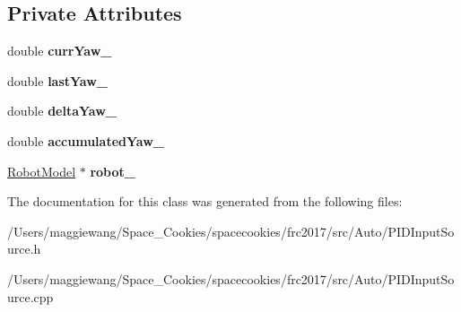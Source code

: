 \subsection*{Private Attributes}
\begin{DoxyCompactItemize}
\item 
\mbox{\label{class_navx_p_i_d_source_a4e7fd0ab07e2a452de4e6dee8046a1e4}} 
double {\bfseries curr\+Yaw\+\_\+}
\item 
\mbox{\label{class_navx_p_i_d_source_ad23e187c9090d314887e3190d9f9f7a7}} 
double {\bfseries last\+Yaw\+\_\+}
\item 
\mbox{\label{class_navx_p_i_d_source_a44ed45bd794ad3011e951a47f1a2dbee}} 
double {\bfseries delta\+Yaw\+\_\+}
\item 
\mbox{\label{class_navx_p_i_d_source_a034f1d606b899986012a67863cab39a3}} 
double {\bfseries accumulated\+Yaw\+\_\+}
\item 
\mbox{\label{class_navx_p_i_d_source_aaf8ac0b9fdad1ee64788ea7b50acc388}} 
\hyperlink{class_robot_model}{Robot\+Model} $\ast$ {\bfseries robot\+\_\+}
\end{DoxyCompactItemize}


The documentation for this class was generated from the following files\+:\begin{DoxyCompactItemize}
\item 
/\+Users/maggiewang/\+Space\+\_\+\+Cookies/spacecookies/frc2017/src/\+Auto/P\+I\+D\+Input\+Source.\+h\item 
/\+Users/maggiewang/\+Space\+\_\+\+Cookies/spacecookies/frc2017/src/\+Auto/P\+I\+D\+Input\+Source.\+cpp\end{DoxyCompactItemize}
